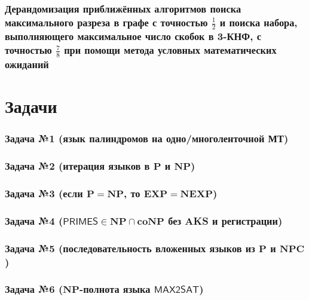 \section{Дерандомизация приближённых алгоритмов поиска максимального разреза в графе с точностью $\frac12$ и поиска набора, выполняющего максимальное число скобок в 3-КНФ, с точностью $\frac78$ при помощи метода условных математических ожиданий}

\newpage

\newpage
\part{Задачи}

\section{Задача №1 (язык палиндромов на одно/многоленточной МТ)}


\section{Задача №2 (итерация языков в $\mathbf{P}$ и $\mathbf{NP}$)}


\section{Задача №3 (если $\mathbf{P} = \mathbf{NP}$, то $\mathbf{EXP} = \mathbf{NEXP}$)}


\section{Задача №4 ($\mathsf{PRIMES} \in \mathbf{NP} \cap \mathbf{coNP}$ без AKS и регистрации)}


\section{Задача №5 (последовательность вложенных языков из $\mathbf{P}$ и $\mathbf{NPC}$)}


\section{Задача №6 ($\mathbf{NP}$-полнота языка $\mathsf{MAX2SAT}$)}


